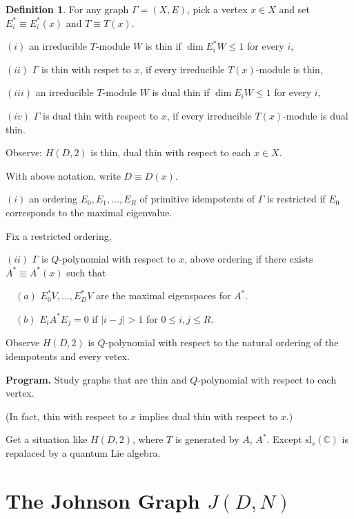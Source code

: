 \documentclass[
]{book}
\theoremstyle{definition}
\newtheorem{definition}{Definition}[chapter]
\theoremstyle{definition}
\theoremstyle{definition}
\theoremstyle{definition}
\theoremstyle{remark}
\begin{document}
\begin{definition}

For any graph \(\Gamma = (X, E)\), pick a vertex \(x\in X\) and set \(E^*_i \equiv E^*_i(x)\) and \(T \equiv T(x)\).

\((i)\) an irreducible \(T\)-module \(W\) is thin  if \(\dim E_i^*W \leq 1\) for every \(i\),

\((ii)\) \(\Gamma\) is thin with respet to \(x\), if every irreducible \(T(x)\)-module is thin,

\((iii)\) an irreducible \(T\)-module \(W\) is dual thin  if \(\dim E_iW \leq 1\) for every \(i\),

\((iv)\) \(\Gamma\) is dual thin with respect to \(x\), if every irreducible \(T(x)\)-module is dual thin.

\end{definition}

Observe: \(H(D,2)\) is thin, dual thin with respect to each \(x\in X\).

With above notation, write \(D \equiv D(x)\).

\((i)\) an ordering \(E_0, E_1, \ldots, E_R\) of primitive idempotents of \(\Gamma\) is restricted  if \(E_0\) corresponds to the maximal eigenvalue.

Fix a restricted ordering,

\((ii)\) \(\Gamma\) is \(Q\)-polynomial with respect to \(x\), above ordering if there exists \(A^* \equiv A^*(x)\) such that

\(\quad (a)\) \(E_0^*V, \ldots, E_D^*V\) are the maximal eigenspaces for \(A^*\).

\(\quad (b)\) \(E_iA^*E_j = 0\) if \(|i-j| > 1\) for \(0\leq i,j\leq R\).

Observe \(H(D,2)\) is \(Q\)-polynomial with respect to the natural ordering of the idempotents and every vetex.

\textbf{Program.} Study graphs that are thin and \(Q\)-polynomial with respect to each vertex.

(In fact, thin with respect to \(x\) implies dual thin with respect to \(x\).)

Get a situation like \(H(D,2)\), where \(T\) is generated by \(A\), \(A^*\). Except \(\mathrm{sl}_s(\mathbb{C})\) is repalaced by a quantum Lie algebra.

\hypertarget{lec7}{%
\chapter{\texorpdfstring{The Johnson Graph \(J(D,N)\)}{The Johnson Graph J(D,N)}}\label{lec7}}
\end{document}
